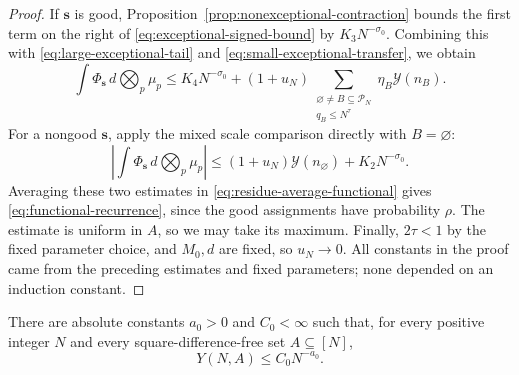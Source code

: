 \begin{proof}
If $\mathbf s$ is good, Proposition~\ref{prop:nonexceptional-contraction}
bounds the first term on the right of \eqref{eq:exceptional-signed-bound} by
$K_3N^{-\sigma_0}$.  Combining this with
\eqref{eq:large-exceptional-tail} and
\eqref{eq:small-exceptional-transfer}, we obtain
\[
 \int\Phi_{\mathbf s}\,d\bigotimes_p\mu_p
 \le K_4N^{-\sigma_0}
 +(1+u_N)
   \sum_{\substack{\varnothing\ne B\subseteq\mathcal P_N\\q_B\le N^\tau}}
      \eta_B\mathcal Y(n_B).
\]
For a nongood $\mathbf s$, apply the mixed scale comparison directly with
$B=\varnothing$:
\[
 \left|\int\Phi_{\mathbf s}\,d\bigotimes_p\mu_p\right|
 \le(1+u_N)\mathcal Y(n_\varnothing)+K_2N^{-\sigma_0}.
\]
Averaging these two estimates in
\eqref{eq:residue-average-functional} gives
\eqref{eq:functional-recurrence}, since the good assignments have probability
$\rho$.  The estimate is uniform in $A$, so we may take its maximum.
Finally, $2\tau<1$ by the fixed parameter choice, and $M_0,d$ are fixed, so
$u_N\to0$.  All constants in the proof came from the preceding estimates and
fixed parameters; none depended on an induction constant.
\end{proof}

\begin{theorem}\label{thm:functional-decay}
There are absolute constants $a_0>0$ and $C_0<\infty$ such that, for every
positive integer $N$ and every square-difference-free set $A\subseteq[N]$,
\[
 Y(N,A)\le C_0N^{-a_0}.
\]
\end{theorem}

